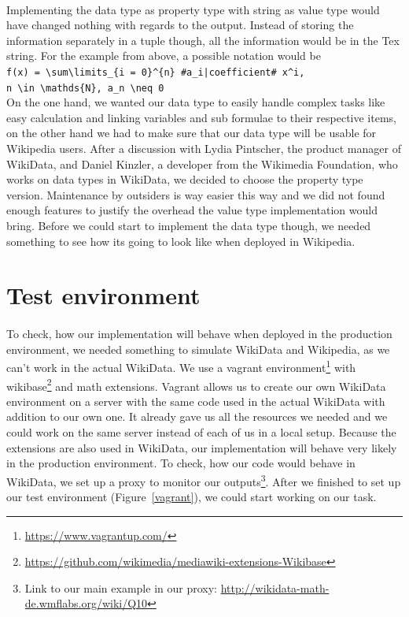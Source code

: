 \documentclass[12pt]{article}
\begin{document}
\paragraph{}
Implementing the data type as property type with string as value type would have changed nothing with regards to the output. Instead of storing the information separately in a tuple though, all the information would be in the Tex string. For the example from above, a possible notation would be\\
\verb!f(x) = \sum\limits_{i = 0}^{n} #a_i|coefficient# x^i,!\\ 
\verb!n \in \mathds{N}, a_n \neq 0!\\
On the one hand, we wanted our data type to easily handle complex tasks like easy calculation and linking variables and sub formulae to their respective items, on the other hand we had to make sure that our data type will be usable for Wikipedia users. After a discussion with Lydia Pintscher, the product manager of WikiData, and Daniel Kinzler, a developer from the Wikimedia Foundation, who works on data types in WikiData, we decided to choose the property type version. Maintenance by outsiders is way easier this way and we did not found enough features to justify the overhead the value type implementation would bring.
Before we could start to implement the data type though, we needed something to see how its going to look like when deployed in Wikipedia. 

\section{Test environment}
\paragraph{}
To check, how our implementation will behave when deployed in the production environment, we needed something to simulate WikiData and Wikipedia, as we can't work in the actual WikiData. 
We use a vagrant environment\footnote{\url{https://www.vagrantup.com/}} with wikibase\footnote{\url{https://github.com/wikimedia/mediawiki-extensions-Wikibase}} and math extensions. Vagrant allows us to create our own WikiData environment on a server with the same code used in the actual WikiData with addition to our own one.
It already gave us all the resources we needed and we could work on the same server instead of each of us in a local setup. Because the extensions are also used in WikiData, our implementation will behave very likely in the production environment. To check, how our code would behave in WikiData, we set up a proxy to monitor our outputs\footnote{Link to our main example in our proxy: \url{http://wikidata-math-de.wmflabs.org/wiki/Q10}}.
After we finished to set up our test environment (Figure~\ref{vagrant}), we could start working on our task.
\end{document}
